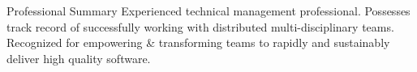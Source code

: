 \documentclass{resume} %
\begin{document}
\vspace{1em}

\begin{rSection}{Professional Summary}
Experienced technical management professional. Possesses track record of successfully working with distributed multi-disciplinary teams. Recognized for empowering \& transforming teams to rapidly and sustainably deliver high quality software.
\end{rSection}

\end{document}
